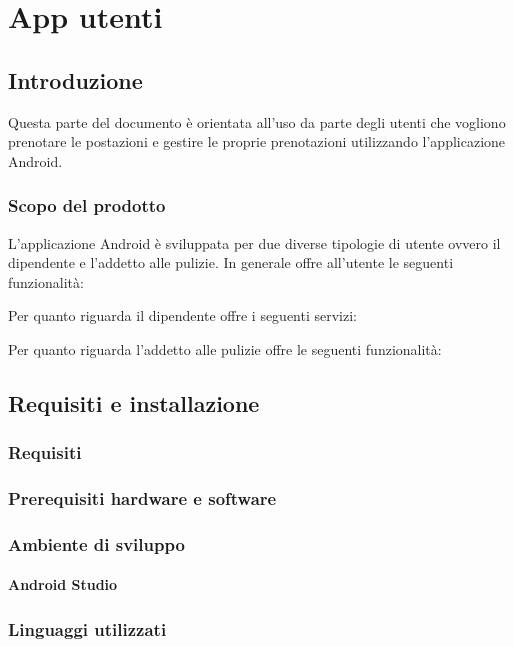 \section{App utenti}
\subsection{Introduzione}
Questa parte del documento è orientata all'uso da parte degli utenti che vogliono prenotare le postazioni e gestire le proprie prenotazioni utilizzando l'applicazione Android.


\subsubsection{Scopo del prodotto}
L'applicazione Android è sviluppata per due diverse tipologie di utente ovvero il dipendente e l'addetto alle pulizie.
In generale offre all'utente le seguenti funzionalità:

Per quanto riguarda il dipendente offre i seguenti servizi:

Per quanto riguarda l'addetto alle pulizie offre le seguenti funzionalità:




\subsection{Requisiti e installazione}


\subsubsection{Requisiti}

\subsubsection{Prerequisiti hardware e software}

\subsubsection{Ambiente di sviluppo}

\paragraph{Android Studio}

\subsubsection{Linguaggi utilizzati}

